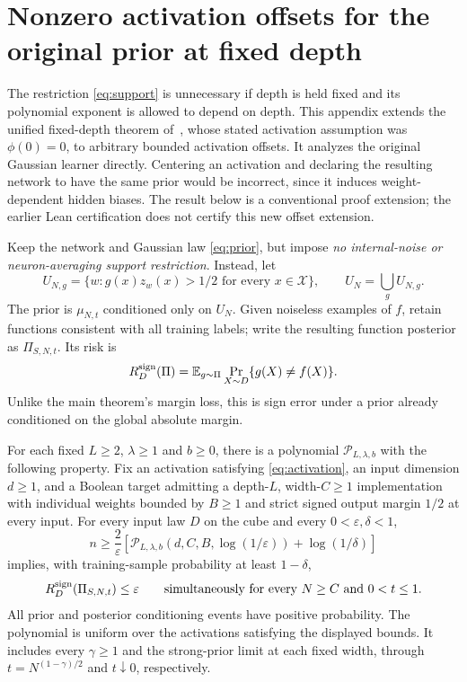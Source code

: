 \section{Nonzero activation offsets for the original prior at fixed depth}
\label{app:offset-original}

The restriction \eqref{eq:support} is unnecessary if depth is held fixed
and its polynomial exponent is allowed to depend on depth. This appendix
extends the unified fixed-depth theorem of~\cite{lipschitz}, whose stated
activation assumption was $\phi(0)=0$, to arbitrary bounded activation
offsets. It analyzes the original Gaussian learner directly. Centering
an activation and declaring the resulting network to have the same prior
would be incorrect, since it induces weight-dependent hidden biases.
The result below is a conventional proof extension; the earlier Lean
certification does not certify this new offset extension.

Keep the network and Gaussian law \eqref{eq:prior}, but impose
\emph{no internal-noise or neuron-averaging support restriction}. Instead,
let
\[
 U_{N,g}=\{w:g(x)z_w(x)>1/2\text{ for every }x\in\mathcal X\},
 \qquad U_N=\bigcup_g U_{N,g}.
\]
The prior is $\mu_{N,t}$ conditioned only on $U_N$. Given noiseless
examples of $f$, retain functions consistent with all training labels;
write the resulting function posterior as $\Pi_{S,N,t}$. Its risk is
\[
 R_D^{\rm sign}(\Pi)=\mathbb E_{g\sim\Pi}\Pr_{X\sim D}\{g(X)\ne f(X)\}.
\]
Unlike the main theorem's margin loss, this is sign error under a prior
already conditioned on the global absolute margin.

\begin{theorem}
\label{thm:offset-original}
For each fixed $L\ge2$, $\lambda\ge1$ and $b\ge0$, there is a polynomial
$\mathcal P_{L,\lambda,b}$ with the following property. Fix an activation
satisfying \eqref{eq:activation}, an input dimension $d\ge1$, and a
Boolean target admitting a depth-$L$, width-$C\ge1$ implementation with
individual weights bounded by $B\ge1$ and strict signed output margin
$1/2$ at every input. For every input law $D$ on the cube and every
$0<\varepsilon,\delta<1$,
\[
 n\ge\frac2\varepsilon\left[
 \mathcal P_{L,\lambda,b}(d,C,B,\log(1/\varepsilon))
 +\log(1/\delta)\right]
\]
implies, with training-sample probability at least $1-\delta$,
\[
 R_D^{\rm sign}(\Pi_{S,N,t})\le\varepsilon
 \qquad\text{simultaneously for every }N\ge C\text{ and }0<t\le1.
\]
All prior and posterior conditioning events have positive probability.
The polynomial is uniform over the activations satisfying the displayed
bounds. It includes every $\gamma\ge1$ and the strong-prior limit at each
fixed width, through $t=N^{(1-\gamma)/2}$ and $t\downarrow0$, respectively.
\end{theorem}

